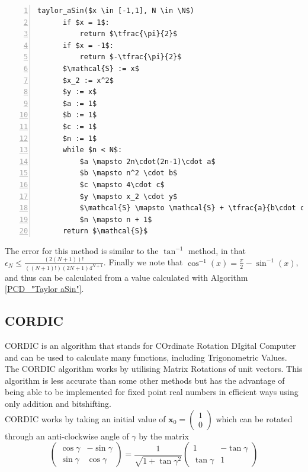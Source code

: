 {%
\begin{lstlisting}[numbers=left,frame=single,mathescape,caption={Taylor Method for \(\sin^{-1}\)},label={PCD_"Taylor aSin"}]
  taylor_aSin($x \in [-1,1], N \in \N$)
      if $x = 1$:
          return $\tfrac{\pi}{2}$
      if $x = -1$:
          return $-\tfrac{\pi}{2}$
      $\mathcal{S} := x$
      $x_2 := x^2$
      $y := x$
      $a := 1$
      $b := 1$
      $c := 1$
      $n := 1$
      while $n < N$:
          $a \mapsto 2n\cdot(2n-1)\cdot a$
          $b \mapsto n^2 \cdot b$
          $c \mapsto 4\cdot c$
          $y \mapsto x_2 \cdot y$
          $\mathcal{S} \mapsto \mathcal{S} + \tfrac{a}{b\cdot c \cdot(2n+1)}\cdot y$
          $n \mapsto n + 1$
      return $\mathcal{S}$
\end{lstlisting}

The error for this method is similar to the \(\tan^{-1}\) method, in that \(\epsilon_N \le \frac{(2(N+1))!}{((N+1)!)(2N+1)4^{N+1}}\). Finally we note that \(\cos^{-1}(x) = \tfrac{\pi}{2} - \sin^{-1}(x)\), and thus can be calculated from a value calculated with Algorithm \ref{PCD_"Taylor aSin"}.

\subsection{CORDIC}
\label{SUB_"CORDIC"}

\theoremstyle{plain}
\newtheorem{Cordic Gamma Property}{Proposition}[subsection]
\newtheorem{Cordic Accuracy}[Cordic Gamma Property]{Proposition}

CORDIC is an algorithm that stands for COrdinate Rotation DIgital Computer and can be used to calculate many functions, including Trigonometric Values. The CORDIC algorithm works by utilising Matrix Rotations of unit vectors. This algorithm is less accurate than some other methods but has the advantage of being able to be implemented for fixed point real numbers in efficient ways using only addition and bitshifting.\\

CORDIC works by taking an initial value of
\begin{math}
	\mathbf{x}_0 = \left( 
		\begin{array}{c}
			1 \\
			0
		\end{array} \right)
\end{math}
which can be rotated through an anti-clockwise angle of $\gamma$ by the matrix
\begin{displaymath}
	\left( \begin{array}{cc}
		\cos{\gamma} & -\sin{\gamma} \\
		\sin{\gamma} &  \cos{\gamma}
	\end{array} \right)
	= \frac{1}{\sqrt{1 + \tan{\gamma}^2}} \left( \begin{array}{cc}
		1 & -\tan{\gamma} \\
		\tan{\gamma} & 1
	\end{array} \right)
\end{displaymath}

}
